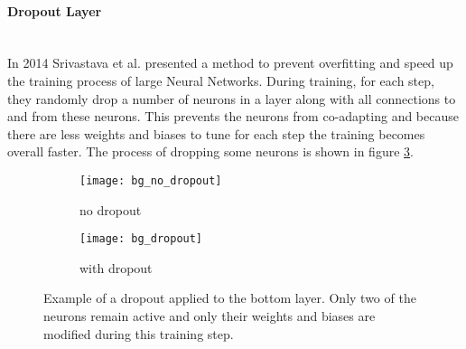 \paragraph{Dropout Layer} ~\\
In 2014 Srivastava et al.\cite{Srivastava2014} presented a method to prevent overfitting and speed up the training process of large Neural Networks. During training, for each step, they randomly drop a number of neurons in a layer along with all connections to and from these neurons. This prevents the neurons from co-adapting  and because there are less weights and biases to tune for each step the training becomes overall faster. The process of dropping some neurons is shown in figure \ref{fig:bg:dropout}.

\begin{figure}[H]
\centering
\begin{subfigure}{.5\textwidth}
    \centering
    \texttt{[image: bg\_no\_dropout]}
    \caption{no dropout}
    \label{}
\end{subfigure}%
\begin{subfigure}{.5\textwidth}
    \centering
    \texttt{[image: bg\_dropout]}
    \caption{with dropout}
    \label{}
\end{subfigure}
\caption{Example of a dropout applied to the bottom layer. Only two of the neurons remain active and only their weights and biases are modified during this training step. \cite{Srivastava2014}}
\label{fig:bg:dropout}
\end{figure}
